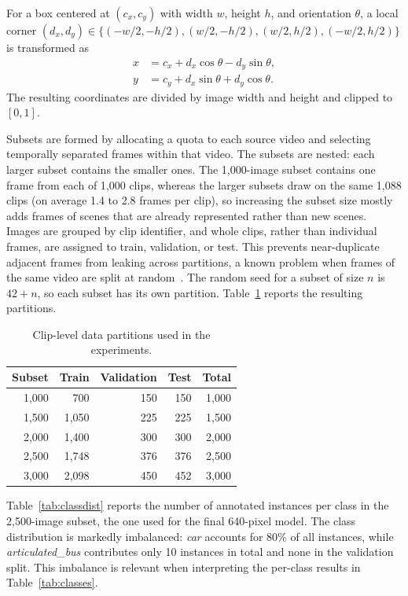 \documentclass[runningheads]{llncs}
\begin{document}
For a box centered at $(c_x,c_y)$ with width $w$, height $h$, and orientation
$\theta$, a local corner $(d_x,d_y) \in \{(-w/2,-h/2),(w/2,-h/2),
(w/2,h/2),(-w/2,h/2)\}$ is transformed as
\begin{equation}
\begin{aligned}
x &= c_x+d_x\cos\theta-d_y\sin\theta,\\
y &= c_y+d_x\sin\theta+d_y\cos\theta.
\end{aligned}
\label{eq:obb}
\end{equation}
The resulting coordinates are divided by image width and height and clipped to
$[0,1]$.

Subsets are formed by allocating a quota to each source video and selecting
temporally separated frames within that video. The subsets are nested: each
larger subset contains the smaller ones. The 1,000-image subset contains one
frame from each of 1,000 clips, whereas the larger subsets draw on the same
1,088 clips (on average 1.4 to 2.8 frames per clip), so increasing the subset
size mostly adds frames of scenes that are already represented rather than new
scenes. Images are grouped by clip identifier, and whole clips, rather than
individual frames, are assigned to train, validation, or test. This prevents
near-duplicate adjacent frames from leaking across partitions, a known problem
when frames of the same video are split at random~\cite{figueiredo2024leakage}. The random seed
for a subset of size $n$ is $42+n$, so each subset has its own partition.
Table~\ref{tab:splits} reports the resulting partitions.

\begin{table}
\caption{Clip-level data partitions used in the experiments.}
\label{tab:splits}
\centering
\begin{tabular}{rrrrr}
\toprule
Subset & Train & Validation & Test & Total \\
\midrule
1,000 & 700 & 150 & 150 & 1,000 \\
1,500 & 1,050 & 225 & 225 & 1,500 \\
2,000 & 1,400 & 300 & 300 & 2,000 \\
2,500 & 1,748 & 376 & 376 & 2,500 \\
3,000 & 2,098 & 450 & 452 & 3,000 \\
\bottomrule
\end{tabular}
\end{table}

Table~\ref{tab:classdist} reports the number of annotated instances per class
in the 2,500-image subset, the one used for the final 640-pixel model. The
class distribution is markedly imbalanced: \textit{car} accounts for 80\% of
all instances, while \textit{articulated\_bus} contributes only 10 instances
in total and none in the validation split. This imbalance is relevant when
interpreting the per-class results in Table~\ref{tab:classes}.
\end{document}
